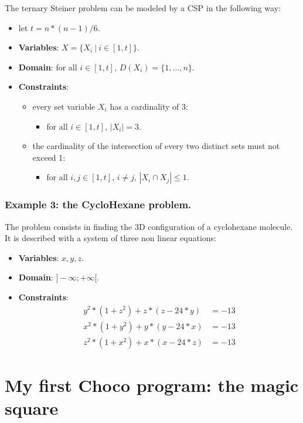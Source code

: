The ternary Steiner problem can be modeled by a CSP in the following way:
\begin{itemize}
	\item let $t = n*(n-1)/6$.
	\item \textbf{Variables}: $X = \{X_{i}\ |\ i\in [1,t]\}$.
	\item \textbf{Domain}: for all $i\in [1,t]$, $D(X_{i}) = \{1,...,n\}$.
	\item \textbf{Constraints}:
	\begin{itemize}
		\item every set variable $X_i$ has a cardinality of 3:
		\begin{itemize}
			\item for all $i\in [1,t]$, $|X_{i}| = 3$.
		\end{itemize}
		\item the cardinality of the intersection of every two distinct sets must not exceed 1:
		\begin{itemize}
			\item for all $i,j\in [1,t]$, $i\neq j$, $|X_{i}\cap X_{j}|\le 1$.
		\end{itemize}
	\end{itemize}
\end{itemize}

\subsubsection{Example 3: the CycloHexane problem.}\label{introduction:example3:thecyclohexaneproblem}\hypertarget{introduction:example3:thecyclohexaneproblem}{}
The problem consists in finding the 3D configuration of a cyclohexane molecule. It is described with a system of three non linear equations:
\begin{itemize}
	\item \textbf{Variables}: $x,y,z$.
	\item \textbf{Domain}: $]-\infty;+\infty[$.
	\item \textbf{Constraints}:
	\begin{align*}
		y^{2} * (1 + z^{2}) + z * (z - 24 * y) &= -13\\
		x^{2} * (1 + y^{2}) + y * (y - 24 * x) &= -13\\
		z^{2} * (1 + x^{2}) + x * (x - 24 * z) &= -13
	\end{align*}
\end{itemize}

\section{My first Choco program: the magic square}\label{introduction:myfirstchocoprogram}\hypertarget{introduction:myfirstchocoprogram}{}

